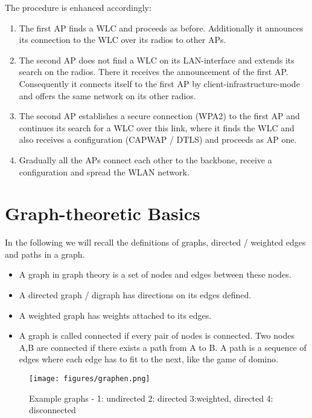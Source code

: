 	The procedure is enhanced accordingly:
	
	\begin{enumerate}
	  \item The first \ac{AP} finds a \ac{WLC} and proceeds as before. Additionally it announces its connection to the \ac{WLC} over its radios to other APs.
	  
	  \item The second \ac{AP} does not find a \ac{WLC} on its \ac{LAN}-interface and extends its search on the radios. 
	    There it receives the announcement of the first \ac{AP}.
	    Consequently it connects itself to the first AP by client-infrastructure-mode and offers the same network on its other radios.
	    
	  \item The second \ac{AP} establishes a secure connection (\ac{WPA2}) to the first \ac{AP} and continues its search for a \ac{WLC} over this link, 
	    where it finds the \ac{WLC} and also receives a configuration (\ac{CAPWAP} / \ac{DTLS}) and proceeds as \ac{AP} one.
	    
	  \item Gradually all the APs connect each other to the backbone, receive a configuration and spread the \ac{WLAN} network.
	\end{enumerate}
	
\section{Graph-theoretic Basics}
  In the following we will recall the definitions of graphs, directed / weighted edges and paths in a graph.
  \begin{itemize}
    \item A graph in graph theory is a set of nodes and edges between these nodes.
    \item A directed graph / digraph has directions on its edges defined.
    \item A weighted graph has weights attached to its edges.
    \item A graph is called connected if every pair of nodes is connected. 
      Two nodes A,B are connected if there exists a path from A to B.
      A path is a sequence of edges where each edge has to fit to the next, like the game of domino.
  \end{itemize}

  \begin{figure}[th!]
    \centering
    \texttt{[image: figures/graphen.png]}
    \caption{Example graphs - 1: undirected 2: directed 3:weighted, directed 4: disconnected}
    \label{fig:graphen}
  \end{figure}

